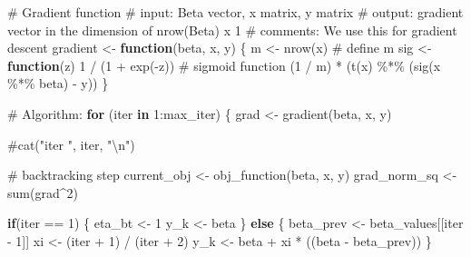 \documentclass[
  letterpaper,
  DIV=11,
  numbers=noendperiod]{scrartcl}
\newenvironment{Shaded}{\begin{snugshade}}{\end{snugshade}}
\newcommand{\CommentTok}[1]{\textcolor[rgb]{0.37,0.37,0.37}{#1}}
\newcommand{\ControlFlowTok}[1]{\textcolor[rgb]{0.00,0.23,0.31}{\textbf{#1}}}
\newcommand{\DecValTok}[1]{\textcolor[rgb]{0.68,0.00,0.00}{#1}}
\newcommand{\FunctionTok}[1]{\textcolor[rgb]{0.28,0.35,0.67}{#1}}
\newcommand{\NormalTok}[1]{\textcolor[rgb]{0.00,0.23,0.31}{#1}}
\newcommand{\OtherTok}[1]{\textcolor[rgb]{0.00,0.23,0.31}{#1}}
\newcommand{\SpecialCharTok}[1]{\textcolor[rgb]{0.37,0.37,0.37}{#1}}
\begin{document}
\begin{Shaded}
\begin{Highlighting}[]
  \CommentTok{\# Gradient function}
  \CommentTok{\# input: Beta vector, x matrix, y matrix}
  \CommentTok{\# output: gradient vector in the dimension of nrow(Beta) x 1}
  \CommentTok{\# comments: We use this for gradient descent}
\NormalTok{  gradient }\OtherTok{\textless{}{-}} \ControlFlowTok{function}\NormalTok{(beta, x, y) \{}
\NormalTok{    m }\OtherTok{\textless{}{-}} \FunctionTok{nrow}\NormalTok{(x)                       }\CommentTok{\# define m}
\NormalTok{    sig }\OtherTok{\textless{}{-}} \ControlFlowTok{function}\NormalTok{(z) }\DecValTok{1} \SpecialCharTok{/}\NormalTok{ (}\DecValTok{1} \SpecialCharTok{+} \FunctionTok{exp}\NormalTok{(}\SpecialCharTok{{-}}\NormalTok{z))  }\CommentTok{\# sigmoid function}
\NormalTok{    (}\DecValTok{1} \SpecialCharTok{/}\NormalTok{ m) }\SpecialCharTok{*}\NormalTok{ (}\FunctionTok{t}\NormalTok{(x) }\SpecialCharTok{\%*\%}\NormalTok{ (}\FunctionTok{sig}\NormalTok{(x }\SpecialCharTok{\%*\%}\NormalTok{ beta) }\SpecialCharTok{{-}}\NormalTok{ y))}
\NormalTok{  \}}

  \CommentTok{\# Algorithm:}
  \ControlFlowTok{for}\NormalTok{ (iter }\ControlFlowTok{in} \DecValTok{1}\SpecialCharTok{:}\NormalTok{max\_iter) \{}
\NormalTok{    grad }\OtherTok{\textless{}{-}} \FunctionTok{gradient}\NormalTok{(beta, x, y)}
    
    \CommentTok{\#cat("iter ", iter, "\textbackslash{}n")}
    
    \CommentTok{\# backtracking step}
\NormalTok{    current\_obj }\OtherTok{\textless{}{-}} \FunctionTok{obj\_function}\NormalTok{(beta, x, y)}
\NormalTok{    grad\_norm\_sq }\OtherTok{\textless{}{-}} \FunctionTok{sum}\NormalTok{(grad}\SpecialCharTok{\^{}}\DecValTok{2}\NormalTok{)}
    
    \ControlFlowTok{if}\NormalTok{(iter }\SpecialCharTok{==} \DecValTok{1}\NormalTok{) \{}
\NormalTok{      eta\_bt }\OtherTok{\textless{}{-}} \DecValTok{1}
\NormalTok{      y\_k }\OtherTok{\textless{}{-}}\NormalTok{ beta}
\NormalTok{    \} }\ControlFlowTok{else}\NormalTok{ \{}
\NormalTok{      beta\_prev }\OtherTok{\textless{}{-}}\NormalTok{ beta\_values[[iter }\SpecialCharTok{{-}} \DecValTok{1}\NormalTok{]]}
\NormalTok{      xi }\OtherTok{\textless{}{-}}\NormalTok{ (iter }\SpecialCharTok{+} \DecValTok{1}\NormalTok{) }\SpecialCharTok{/}\NormalTok{ (iter }\SpecialCharTok{+} \DecValTok{2}\NormalTok{)}
\NormalTok{      y\_k }\OtherTok{\textless{}{-}}\NormalTok{ beta }\SpecialCharTok{+}\NormalTok{ xi }\SpecialCharTok{*}\NormalTok{ ((beta }\SpecialCharTok{{-}}\NormalTok{ beta\_prev))}
\NormalTok{    \}}


\end{Highlighting}
\end{Shaded}
\end{document}
